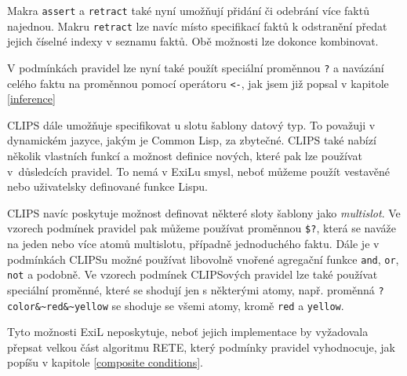 Makra \verb|assert| a \verb|retract| také nyní umožňují přidání či odebrání
více faktů najednou. Makru \verb|retract| lze navíc místo specifikací faktů k
odstranění předat jejich číselné indexy v seznamu faktů. Obě možnosti lze
dokonce kombinovat.

V podmínkách pravidel lze nyní také použít speciální proměnnou \verb|?| a
navázání celého faktu na proměnnou pomocí operátoru \verb|<-|, jak jsem již
popsal v kapitole \ref{inference}

CLIPS dále umožňuje specifikovat u slotu šablony datový typ. To považuji v
dynamickém jazyce, jakým je Common Lisp, za zbytečné. CLIPS také nabízí několik
vlastních funkcí a možnost definice nových, které pak lze používat v~důsledcích
pravidel. To nemá v ExiLu smysl, neboť můžeme použít vestavěné nebo uživatelsky
definované funkce Lispu.

CLIPS navíc poskytuje možnost definovat některé sloty šablony jako
\emph{multislot}. Ve vzorech podmínek pravidel pak můžeme používat proměnnou
\verb|$?|, která se naváže na jeden nebo více atomů multislotu, případně
jednoduchého faktu. Dále je v podmínkách CLIPSu možné používat libovolně vnořené
agregační funkce \verb|and|, \verb|or|, \verb|not| a podobně. Ve vzorech
podmínek CLIPSových pravidel lze také používat speciální proměnné, které se
shodují jen s některými atomy, např. proměnná \verb|?color&~red&~yellow| se
shoduje se všemi atomy, kromě \verb|red| a \verb|yellow|.

Tyto možnosti ExiL neposkytuje, neboť jejich implementace by vyžadovala přepsat
velkou část algoritmu RETE, který podmínky pravidel vyhodnocuje, jak popíšu v
kapitole \ref{composite conditions}.
